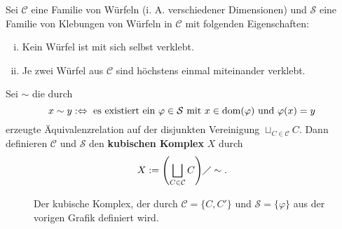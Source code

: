 \begin{defn}
\label{def:kub_kplx}
	Sei $\mathcal{C}$ eine Familie von Würfeln (i. A. verschiedener Dimensionen) und $\mathcal{S}$ eine Familie von Klebungen von Würfeln in $\mathcal{C}$ mit folgenden Eigenschaften:
	\begin{enumerate}[(i)]
		\item Kein Würfel ist mit sich selbst verklebt.
		\item Je zwei Würfel aus $\mathcal{C}$ sind höchstens einmal miteinander verklebt.
	\end{enumerate}
	\newpage
	Sei $\sim$ die durch
	\[
		x \sim y :\Leftrightarrow \text{ es existiert ein } \varphi \in \mathcal{S} \text{ mit } x \in \operatorname{dom}(\varphi) \text{ und } \varphi(x) = y
	\]
	erzeugte Äquivalenzrelation	auf der disjunkten Vereinigung $\sqcup_{C \in \mathcal{C}} C$. Dann definieren $\mathcal{C}$ und $\mathcal{S}$ den \textbf{kubischen Komplex} $X$ durch
	\[
		X := \enbrace*{\bigsqcup_{C \in \mathcal{C}} C} \diagup \sim.
	\]
\end{defn}
\begin{figure}[h]
\centering
{}
	\caption*{Der kubische Komplex, der durch $\mathcal{C} = \{C,C'\}$ und $\mathcal{S} = \{\varphi\}$ aus der vorigen Grafik definiert wird.}
\end{figure}

